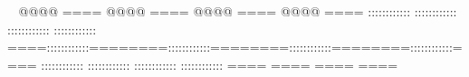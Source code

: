        @@@@    ====        @@@@    ====        @@@@    ====        @@@@    ====    ::::::::::::        ::::::::::::        ::::::::::::        ::::::::::::    ====::::::::::::========::::::::::::========::::::::::::========::::::::::::====    ::::::::::::        ::::::::::::        ::::::::::::        ::::::::::::    ====                ====                ====                ====                 